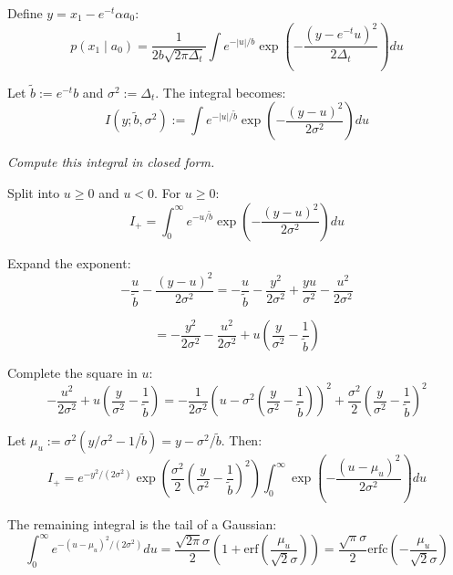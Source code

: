 \documentclass[11pt,a4paper]{article}
\theoremstyle{plain}
\theoremstyle{definition}
\newcommand{\delt}{\Delta_t}
\begin{document}
Define $y = x_1 - e^{-t}\alpha a_0$:
\begin{equation}
p(x_1 \mid a_0) = \frac{1}{2b\sqrt{2\pi\delt}}\int e^{-|u|/b}\exp\left(-\frac{(y-e^{-t}u)^2}{2\delt}\right) du
\end{equation}

Let $\tilde{b} := e^{-t}b$ and $\sigma^2 := \delt$. The integral becomes:
\begin{equation}
I(y; \tilde{b}, \sigma^2) := \int e^{-|u|/\tilde{b}}\exp\left(-\frac{(y-u)^2}{2\sigma^2}\right) du
\end{equation}

\textit{Compute this integral in closed form.}

Split into $u \ge 0$ and $u < 0$. For $u \ge 0$:
\begin{equation}
I_+ = \int_0^\infty e^{-u/\tilde{b}}\exp\left(-\frac{(y-u)^2}{2\sigma^2}\right) du
\end{equation}

Expand the exponent:
\begin{equation}
-\frac{u}{\tilde{b}} - \frac{(y-u)^2}{2\sigma^2} = -\frac{u}{\tilde{b}} - \frac{y^2}{2\sigma^2} + \frac{yu}{\sigma^2} - \frac{u^2}{2\sigma^2}
\end{equation}

\begin{equation}
= -\frac{y^2}{2\sigma^2} - \frac{u^2}{2\sigma^2} + u\left(\frac{y}{\sigma^2} - \frac{1}{\tilde{b}}\right)
\end{equation}

Complete the square in $u$:
\begin{equation}
-\frac{u^2}{2\sigma^2} + u\left(\frac{y}{\sigma^2} - \frac{1}{\tilde{b}}\right) = -\frac{1}{2\sigma^2}\left(u - \sigma^2\left(\frac{y}{\sigma^2} - \frac{1}{\tilde{b}}\right)\right)^2 + \frac{\sigma^2}{2}\left(\frac{y}{\sigma^2} - \frac{1}{\tilde{b}}\right)^2
\end{equation}

Let $\mu_u := \sigma^2(y/\sigma^2 - 1/\tilde{b}) = y - \sigma^2/\tilde{b}$. Then:
\begin{equation}
I_+ = e^{-y^2/(2\sigma^2)}\exp\left(\frac{\sigma^2}{2}\left(\frac{y}{\sigma^2}-\frac{1}{\tilde{b}}\right)^2\right)\int_0^\infty\exp\left(-\frac{(u-\mu_u)^2}{2\sigma^2}\right)du
\end{equation}

The remaining integral is the tail of a Gaussian:
\begin{equation}
\int_0^\infty e^{-(u-\mu_u)^2/(2\sigma^2)} du = \frac{\sqrt{2\pi}\sigma}{2}\left(1 + \text{erf}\left(\frac{\mu_u}{\sqrt{2}\sigma}\right)\right) = \frac{\sqrt{\pi}\sigma}{2}\text{erfc}\left(-\frac{\mu_u}{\sqrt{2}\sigma}\right)
\end{equation}
\end{document}
